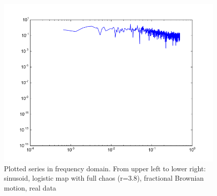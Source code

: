 \documentclass[12pt]{article}
\begin{document}
\begin{figure}
\begin{center}
    \includegraphics[scale=0.4]{spectrum_vr}
  \end{center}
  \caption{Plotted series in frequency domain. From upper left to lower right: sinusoid, logistic map with full chaos (r=3.8), fractional Brownian motion, real data}
\end{figure}
\end{document}
